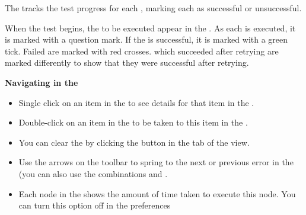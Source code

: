 % 
%
%

The \gdtestresultview{}  tracks the test progress for each \gdsuite{}, marking each \gdstep{} as successful or unsuccessful.

When the test begins, the \gdsteps{} to be executed appear in the \gdtestresultview{}. As each \gdstep{} is executed, it is marked with a question mark. If the \gdstep{} is successful, it is marked with a green tick. Failed \gdsteps{} are marked with red crosses. \gdsteps{} which succeeded after retrying  are marked differently to show that they were successful after retrying. 

\textbf{Navigating in the \gdtestresultview{}}\\
\begin{itemize}
\item Single click on an item in the \gdtestresultview{} to see details for that item in the \gdpropview{}.
\item Double-click on an item in the \gdtestresultview{} to be taken to this item in the \gdsuite{}. 
\item You can clear the \gdtestresultview{} by clicking the  button in the tab of the view. 
\item Use the arrows on the toolbar to spring to the next or previous error in the \gdtestresultview{} (you can also use the combinations  and .
\item Each node in the \gdtestresultview{} shows the amount of time taken to execute this node. You can turn this option off in the preferences 
\end{itemize}

